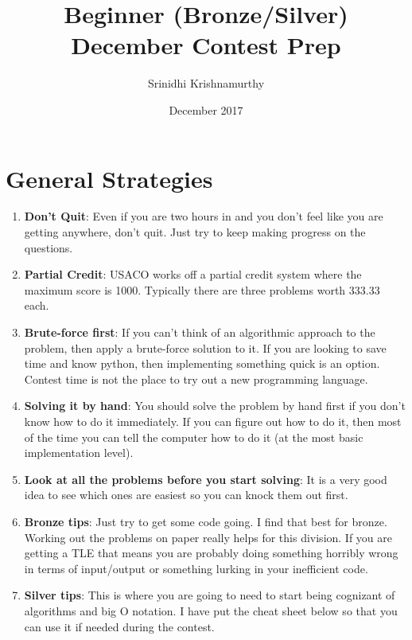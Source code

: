 \documentclass{article}
\title{Beginner (Bronze/Silver) December Contest Prep}
\author{Srinidhi Krishnamurthy}
\date{December 2017}
\begin{document}
\maketitle

\section{General Strategies}
\begin{enumerate}
    \item \textbf{Don't Quit}: Even if you are two hours in and you don't feel like you are getting anywhere, don't quit. Just try to keep making progress on the questions.
    \item \textbf{Partial Credit}: USACO works off a partial credit system where the maximum score is 1000. Typically there are three problems worth 333.33 each.
    \item \textbf{Brute-force first}: If you can't think of an algorithmic approach to the problem, then apply a brute-force solution to it. If you are looking to save time and know python, then implementing something quick is an option. Contest time is not the place to try out a new programming language.
    
    \item \textbf{Solving it by hand}: You should solve the problem by hand first if you don't know how to do it immediately. If you can figure out how to do it, then most of the time you can tell the computer how to do it (at the most basic implementation level).  
    
    \item \textbf{Look at all the problems before you start solving}: It is a very good idea to see which ones are easiest so you can knock them out first. 
    
    \item \textbf{Bronze tips}: Just try to get some code going. I find that best for bronze. Working out the problems on paper really helps for this division. If you are getting a TLE that means you are probably doing something horribly wrong in terms of input/output or something lurking in your inefficient code.
    
    \item \textbf{Silver tips}: This is where you are going to need to start being cognizant of algorithms and big O notation. I have put the cheat sheet below so that you can use it if needed during the contest. 
\end{enumerate}
\end{document}
